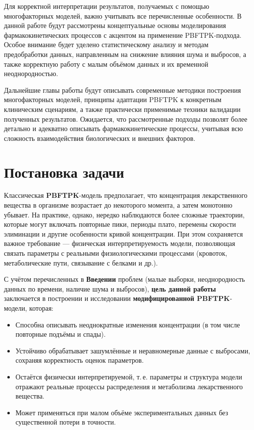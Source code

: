\documentclass[oneside,senior,etd]{BYUPhys}
\begin{document}
Для корректной интерпретации результатов, получаемых с помощью многофакторных моделей, важно учитывать все перечисленные особенности. В данной работе будут рассмотрены концептуальные основы моделирования фармакокинетических процессов с акцентом на применение PBFTPK-подхода. Особое внимание будет уделено статистическому анализу и методам предобработки данных, направленным на снижение влияния шума и выбросов, а также корректную работу с малым объёмом данных и их временной неоднородностью.

Дальнейшие главы работы будут описывать современные методики построения многофакторных моделей, принципы адаптации PBFTPK к конкретным клиническим сценариям, а также практически применимые техники валидации полученных результатов. Ожидается, что рассмотренные подходы позволят более детально и адекватно описывать фармакокинетические процессы, учитывая всю сложность взаимодействия биологических и внешних факторов.

\section{Постановка задачи}

Классическая \textbf{PBFTPK}-модель предполагает, что концентрация лекарственного вещества в организме возрастает до некоторого момента, а затем монотонно убывает. На практике, однако, нередко наблюдаются более сложные траектории, которые могут включать повторные пики, периоды плато, перемены скорости элиминации и другие особенности кривой концентрации. При этом сохраняется важное требование --- физическая интерпретируемость модели, позволяющая связать параметры с реальными физиологическими процессами (кровоток, метаболические пути, связывание с белками и др.).

С учётом перечисленных в \textbf{Введении} проблем (малые выборки, неоднородность данных по времени, наличие шума и выбросов), \textbf{цель данной работы} заключается в построении и исследовании \textbf{модифицированной PBFTPK}-модели, которая:

\begin{itemize}
	\item Способна описывать неоднократные изменения концентрации (в том числе повторные подъёмы и спады).
	\item Устойчиво обрабатывает зашумлённые и неравномерные данные с выбросами, сохраняя корректность оценок параметров.
	\item Остаётся физически интерпретируемой, т.\,е. параметры и структура модели отражают реальные процессы распределения и метаболизма лекарственного вещества.
	\item Может применяться при малом объёме экспериментальных данных без существенной потери в точности.
\end{itemize}
\end{document}
